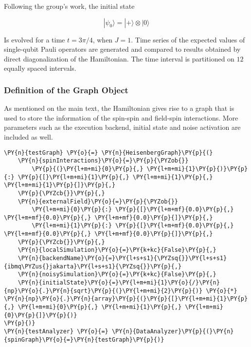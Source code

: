 Following the group's work, the initial state

\[
|\psi_0\rangle = |+\rangle\otimes|0\rangle
\]

Is evolved for a time \(t=3 \pi /4\), when \(J = 1\). Time series of the
expected values of single-qubit Pauli operators are generated and
compared to results obtained by direct diagonalization of the
Hamiltonian. The time interval is partitioned on \(12\) equally spaced
intervals.

    \hypertarget{definition-of-the-graph-object}{%
\subsubsection{Definition of the Graph
Object}\label{definition-of-the-graph-object}}

As mentioned on the main text, the Hamiltonian gives rise to a graph
that is used to store the information of the spin-spin and field-spin
interactions. More parameters such as the execution backend, initial
state and noise activation are included as well.

    \begin{tcolorbox}[breakable, size=fbox, boxrule=1pt, pad at break*=1mm,colback=cellbackground, colframe=cellborder]
\begin{Verbatim}[commandchars=\\\{\}]
\PY{n}{testGraph} \PY{o}{=} \PY{n}{HeisenbergGraph}\PY{p}{(}
    \PY{n}{spinInteractions}\PY{o}{=}\PY{p}{\PYZob{}}
        \PY{p}{(}\PY{l+m+mi}{0}\PY{p}{,} \PY{l+m+mi}{1}\PY{p}{)}\PY{p}{:} \PY{p}{[}\PY{l+m+mi}{1}\PY{p}{,} \PY{l+m+mi}{1}\PY{p}{,} \PY{l+m+mi}{1}\PY{p}{]}\PY{p}{,}
    \PY{p}{\PYZcb{}}\PY{p}{,}
    \PY{n}{externalField}\PY{o}{=}\PY{p}{\PYZob{}}
        \PY{l+m+mi}{0}\PY{p}{:} \PY{p}{[}\PY{l+m+mf}{0.0}\PY{p}{,} \PY{l+m+mf}{0.0}\PY{p}{,} \PY{l+m+mf}{0.0}\PY{p}{]}\PY{p}{,}
        \PY{l+m+mi}{1}\PY{p}{:} \PY{p}{[}\PY{l+m+mf}{0.0}\PY{p}{,} \PY{l+m+mf}{0.0}\PY{p}{,} \PY{l+m+mf}{0.0}\PY{p}{]}\PY{p}{,}
    \PY{p}{\PYZcb{}}\PY{p}{,}
    \PY{n}{localSimulation}\PY{o}{=}\PY{k+kc}{False}\PY{p}{,}
    \PY{n}{backendName}\PY{o}{=}\PY{l+s+s1}{\PYZsq{}}\PY{l+s+s1}{ibmq\PYZus{}jakarta}\PY{l+s+s1}{\PYZsq{}}\PY{p}{,}
    \PY{n}{noisySimulation}\PY{o}{=}\PY{k+kc}{False}\PY{p}{,}
    \PY{n}{initialState}\PY{o}{=}\PY{l+m+mi}{1}\PY{o}{/}\PY{n}{np}\PY{o}{.}\PY{n}{sqrt}\PY{p}{(}\PY{l+m+mi}{2}\PY{p}{)} \PY{o}{*} \PY{n}{np}\PY{o}{.}\PY{n}{array}\PY{p}{(}\PY{p}{[}\PY{l+m+mi}{1}\PY{p}{,} \PY{l+m+mi}{0}\PY{p}{,} \PY{l+m+mi}{1}\PY{p}{,} \PY{l+m+mi}{0}\PY{p}{]}\PY{p}{)}
\PY{p}{)}
\PY{n}{testAnalyzer} \PY{o}{=} \PY{n}{DataAnalyzer}\PY{p}{(}\PY{n}{spinGraph}\PY{o}{=}\PY{n}{testGraph}\PY{p}{)}
\end{Verbatim}
\end{tcolorbox}

